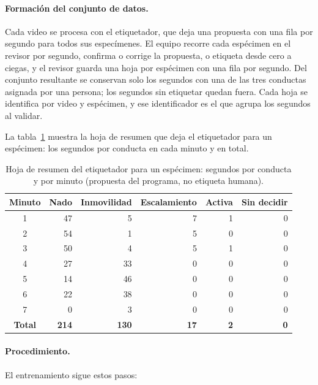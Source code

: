 \FloatBarrier

\paragraph{Formación del conjunto de datos.} Cada video se procesa con el etiquetador, que deja una propuesta con una fila
por segundo para todos sus especímenes. El equipo recorre cada espécimen en el revisor por segundo, confirma o corrige
la propuesta, o etiqueta desde cero a ciegas, y el revisor guarda una hoja por espécimen con una fila por segundo. Del conjunto resultante se conservan solo los segundos con una de las tres
conductas asignada por una persona; los segundos sin etiquetar quedan fuera. Cada hoja se identifica por video y
espécimen, y ese identificador es el que agrupa los segundos al validar.

La tabla~\ref{tab:resumen_etiquetador} muestra la hoja de resumen que deja el etiquetador para un espécimen: los
segundos por conducta en cada minuto y en total.

\begin{table}[H]
\centering
\caption{Hoja de resumen del etiquetador para un espécimen: segundos por conducta y por minuto (propuesta del
programa, no etiqueta humana).}
\label{tab:resumen_etiquetador}
\begin{tabular}{|c|r|r|r|r|r|}
\hline
\textbf{Minuto} & \textbf{Nado} & \textbf{Inmovilidad} & \textbf{Escalamiento} & \textbf{Activa} & \textbf{Sin decidir} \\
\hline
1 & 47 & 5 & 7 & 1 & 0 \\
\hline
2 & 54 & 1 & 5 & 0 & 0 \\
\hline
3 & 50 & 4 & 5 & 1 & 0 \\
\hline
4 & 27 & 33 & 0 & 0 & 0 \\
\hline
5 & 14 & 46 & 0 & 0 & 0 \\
\hline
6 & 22 & 38 & 0 & 0 & 0 \\
\hline
7 & 0 & 3 & 0 & 0 & 0 \\
\hline
\textbf{Total} & \textbf{214} & \textbf{130} & \textbf{17} & \textbf{2} & \textbf{0} \\
\hline
\end{tabular}
\end{table}

\paragraph{Procedimiento.} El entrenamiento sigue estos pasos:

